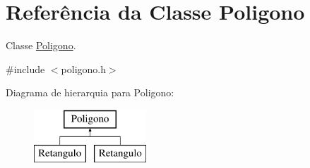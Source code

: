 \hypertarget{classPoligono}{}\section{Referência da Classe Poligono}
\label{classPoligono}


Classe \mbox{\hyperlink{classPoligono}{Poligono}}.  




{\ttfamily \#include $<$poligono.\+h$>$}

Diagrama de hierarquia para Poligono\+:\begin{figure}[H]
\begin{center}
\leavevmode
\includegraphics[height=2.000000cm]{classPoligono}
\end{center}
\end{figure}
